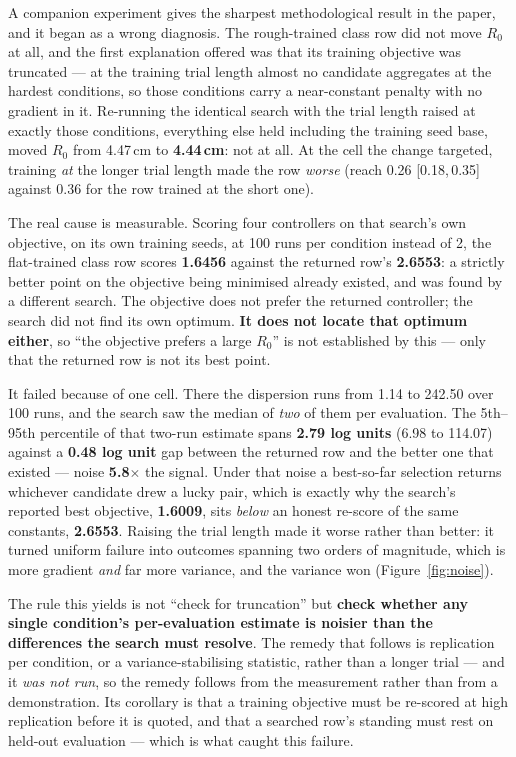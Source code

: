 \documentclass[11pt,a4paper]{article}
\newcommand{\CI}[2]{[#1,\,#2]}
\begin{document}
A companion experiment gives the sharpest methodological result in the paper, and
it began as a wrong diagnosis. The rough-trained class row did not move $R_0$ at
all, and the first explanation offered was that its training objective was
truncated --- at the training trial length almost no candidate aggregates at the
hardest conditions, so those conditions carry a near-constant penalty with no
gradient in it. Re-running the identical search with the trial length raised at
exactly those conditions, everything else held including the training seed base,
moved $R_0$ from 4.47\,cm to \textbf{4.44\,cm}: not at all. At the cell the change
targeted, training \emph{at} the longer trial length made the row \emph{worse}
(reach 0.26 \CI{0.18}{0.35} against 0.36 for the row trained at the short one).

The real cause is measurable. Scoring four controllers on that search's own
objective, on its own training seeds, at 100 runs per condition instead of 2, the
flat-trained class row scores \textbf{1.6456} against the returned row's
\textbf{2.6553}: a strictly better point on the objective being minimised already
existed, and was found by a different search. The objective does not prefer the
returned controller; the search did not find its own optimum. \textbf{It does
not locate that optimum either}, so ``the objective prefers a large $R_0$'' is
not established by this --- only that the returned row is not its best point.

It failed because of one cell. There the dispersion runs from 1.14 to 242.50 over
100 runs, and the search saw the median of \emph{two} of them per evaluation. The
5th--95th percentile of that two-run estimate spans \textbf{2.79 log units}
(6.98 to 114.07) against a \textbf{0.48 log unit} gap between the returned row and
the better one that existed --- noise \textbf{5.8$\times$} the signal. Under that
noise a best-so-far selection returns whichever candidate drew a lucky pair,
which is exactly why the search's reported best objective, \textbf{1.6009}, sits
\emph{below} an honest re-score of the same constants, \textbf{2.6553}. Raising
the trial length made it worse rather than better: it turned uniform failure into
outcomes spanning two orders of magnitude, which is more gradient \emph{and} far
more variance, and the variance won (Figure~\ref{fig:noise}).

The rule this yields is not ``check for truncation'' but \textbf{check whether
any single condition's per-evaluation estimate is noisier than the differences
the search must resolve}. The remedy that follows is replication per condition,
or a variance-stabilising statistic, rather than a longer trial --- and it
\emph{was not run}, so the remedy follows from the measurement rather than from
a demonstration. Its corollary is that
a training objective must be re-scored at high replication before it is quoted,
and that a searched row's standing must rest on held-out evaluation --- which is
what caught this failure.
\end{document}
